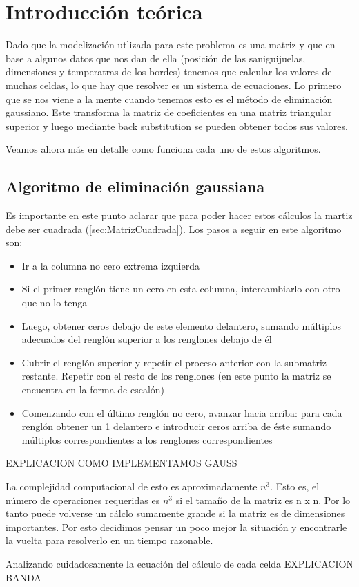 \section{Introducci\'on te\'orica}

Dado que la modelización utlizada para este problema es una matriz y que en base a algunos datos que nos dan de ella (posición de las saniguijuelas, dimensiones y temperatras de los bordes) tenemos que calcular los valores de muchas celdas, lo que hay que resolver es un sistema de ecuaciones. 
Lo primero que se nos viene a la mente cuando tenemos esto es el método de eliminación gaussiano. Este transforma la matriz de coeficientes en una matriz triangular superior y luego mediante back substitution se pueden obtener todos sus valores.

Veamos ahora más en detalle como funciona cada uno de estos algoritmos.

\subsection{Algoritmo de eliminación gaussiana}
Es importante en este punto aclarar que para poder hacer estos cálculos la martiz debe ser cuadrada (\ref{sec:MatrizCuadrada}).
Los pasos a seguir en este algoritmo son:

\begin{itemize}

\item Ir a la columna no cero extrema izquierda
\item Si el primer renglón tiene un cero en esta columna, intercambiarlo con otro que no lo tenga
\item Luego, obtener ceros debajo de este elemento delantero, sumando múltiplos adecuados del renglón superior a los renglones debajo de él
\item Cubrir el renglón superior y repetir el proceso anterior con la submatriz restante. Repetir con el resto de los renglones (en este punto la matriz se encuentra en la forma de escalón)
\item Comenzando con el último renglón no cero, avanzar hacia arriba: para cada renglón obtener un 1 delantero e introducir ceros arriba de éste sumando múltiplos 
correspondientes a los renglones correspondientes

\end{itemize}

EXPLICACION COMO IMPLEMENTAMOS GAUSS
 
La complejidad computacional de esto es aproximadamente $n^3$. Esto es, el número de operaciones requeridas es $n^3$ si el tamaño de la matriz es n x n. Por lo tanto puede volverse un cálclo sumamente grande si la matriz es de dimensiones importantes. Por esto decidimos pensar un poco mejor la situación y encontrarle la vuelta para resolverlo en un tiempo razonable. 

Analizando cuidadosamente la ecuación del cálculo de cada celda EXPLICACION BANDA 






